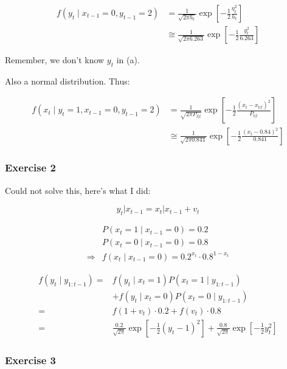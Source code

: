 {{\begin{enumerate}[label=(\alph*)]
{$$
\begin{aligned}
f\left(y_{t} \mid x_{t-1}=0, y_{t-1}=2\right) & =\frac{1}{\sqrt{2 \pi h_{t}}} \exp \left[-\frac{1}{2} \frac{\eta_{t}^{2}}{h_{t}}\right] \\
& \cong \frac{1}{\sqrt{2 \pi 6.263}} \exp \left[-\frac{1}{2} \frac{y_{t}^{2}}{6.263}\right]
\end{aligned}
$$

Remember, we don't know $y_t$ in (a).
}
{\item 
Also a normal distribution. Thus:

$$
\begin{aligned}
f\left(x_{t} \mid y_{t}=1, x_{t-1}=0, y_{t-1}=2\right) & =\frac{1}{\sqrt{2 \pi P_{t|t}}} \exp \left[-\frac{1}{2} \frac{\left(x_{t}-x_{t|t}\right)^{2}}{P_{t|t}}\right] \\
& \cong \frac{1}{\sqrt{2 \pi 0.841}} \exp \left[-\frac{1}{2} \frac{\left(x_{t}-0.84\right)^{2}}{0.841}\right]
\end{aligned}
$$
}
\end{enumerate}
}
{
\subsubsection*{Exercise 2}

\color{red} Could not solve this, here's what I did: \color{black}

$$
y_{t}\left|x_{t-1}=x_{t}\right| x_{t-1}+v_{t}
$$

$$
\begin{aligned}
& P\left(x_{t}=1 \mid x_{t-1}=0\right)=0.2  \\
& P\left(x_{t}=0 \mid x_{t-1}=0\right)=0.8 \\
\Rightarrow &f\left(x_{t} \mid x_{t-1}=0\right)=0.2^{x_{t}} \cdot 0.8^{1-x_{t}}
\end{aligned}
$$

$$
\begin{aligned}
f\left(y_{t} \mid y_{1: t-1}\right)= & f\left(y_{t} \mid x_{t}=1\right) P\left(x_{t}=1 \mid y_{1: t-1}\right) \\
& +f\left(y_{t} \mid x_{t}=0\right) P\left(x_{t}=0 \mid y_{1: t-1}\right) \\
= & f\left(1+v_{t}\right) \cdot 0.2+f\left(v_{t}\right) \cdot 0.8 \\
= & \frac{0.2}{\sqrt{2 \pi}} \exp \left[-\frac{1}{2}\left(y_{t}-1\right)^{2}\right]+\frac{0.8}{\sqrt{2 \pi}} \exp \left[-\frac{1}{2} y_{t}^{2}\right]
\end{aligned}
$$
}
{
\subsubsection*{Exercise 3}

}}
